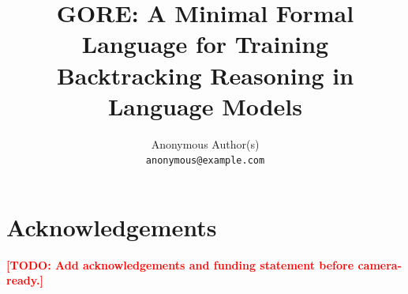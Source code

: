 \documentclass{article}
\title{GORE: A Minimal Formal Language for Training Backtracking Reasoning
       in Language Models}
\author{%
  Anonymous Author(s) \\
  \texttt{anonymous@example.com}
}
\newcommand{\todo}[1]{\textcolor{red}{\textbf{[TODO: #1]}}}
\begin{document}
\maketitle

\begin{abstract}

\end{abstract}










\section*{Acknowledgements}
\todo{Add acknowledgements and funding statement before camera-ready.}





\end{document}
